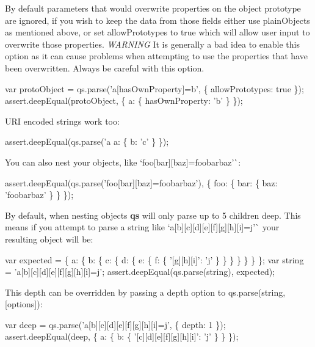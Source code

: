 By default parameters that would overwrite properties on the object prototype are ignored, if you wish to keep the data from those fields either use {\ttfamily plain\+Objects} as mentioned above, or set {\ttfamily allow\+Prototypes} to {\ttfamily true} which will allow user input to overwrite those properties. {\itshape W\+A\+R\+N\+I\+NG} It is generally a bad idea to enable this option as it can cause problems when attempting to use the properties that have been overwritten. Always be careful with this option.


\begin{DoxyCode}
var protoObject = qs.parse('a[hasOwnProperty]=b', \{ allowPrototypes: true \});
assert.deepEqual(protoObject, \{ a: \{ hasOwnProperty: 'b' \} \});
\end{DoxyCode}


U\+RI encoded strings work too\+:


\begin{DoxyCode}
assert.deepEqual(qs.parse('a%
  a: \{ b: 'c' \}
\});
\end{DoxyCode}


You can also nest your objects, like `\textquotesingle{}foo\mbox{[}bar\mbox{]}\mbox{[}baz\mbox{]}=foobarbaz'\`{}\+:


\begin{DoxyCode}
assert.deepEqual(qs.parse('foo[bar][baz]=foobarbaz'), \{
  foo: \{
    bar: \{
      baz: 'foobarbaz'
    \}
  \}
\});
\end{DoxyCode}


By default, when nesting objects {\bfseries qs} will only parse up to 5 children deep. This means if you attempt to parse a string like `\textquotesingle{}a\mbox{[}b\mbox{]}\mbox{[}c\mbox{]}\mbox{[}d\mbox{]}\mbox{[}e\mbox{]}\mbox{[}f\mbox{]}\mbox{[}g\mbox{]}\mbox{[}h\mbox{]}\mbox{[}i\mbox{]}=j'\`{} your resulting object will be\+:


\begin{DoxyCode}
var expected = \{
  a: \{
    b: \{
      c: \{
        d: \{
          e: \{
            f: \{
              '[g][h][i]': 'j'
            \}
          \}
        \}
      \}
    \}
  \}
\};
var string = 'a[b][c][d][e][f][g][h][i]=j';
assert.deepEqual(qs.parse(string), expected);
\end{DoxyCode}


This depth can be overridden by passing a {\ttfamily depth} option to {\ttfamily qs.\+parse(string, \mbox{[}options\mbox{]})}\+:


\begin{DoxyCode}
var deep = qs.parse('a[b][c][d][e][f][g][h][i]=j', \{ depth: 1 \});
assert.deepEqual(deep, \{ a: \{ b: \{ '[c][d][e][f][g][h][i]': 'j' \} \} \});
\end{DoxyCode}


